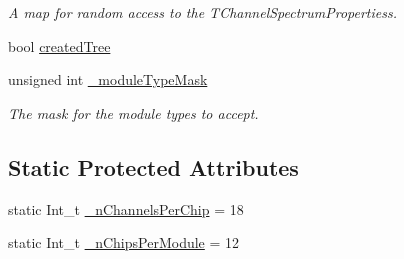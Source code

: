 \begin{DoxyCompactItemize}
\begin{DoxyCompactList}\small\item\em A map for random access to the TChannelSpectrumPropertiess. \item\end{DoxyCompactList}\item 
bool \hyperlink{class_spectrum_properties_run_info_afcbed8adc08c7cfbca19df402943a770}{createdTree}
\item 
unsigned int \hyperlink{class_spectrum_properties_run_info_a4d7328dfa2acc72cbaaf1b897c975b62}{\_\-moduleTypeMask}
\begin{DoxyCompactList}\small\item\em The mask for the module types to accept. \item\end{DoxyCompactList}\end{DoxyCompactItemize}
\subsection*{Static Protected Attributes}
\begin{DoxyCompactItemize}
\item 
static Int\_\-t \hyperlink{class_spectrum_properties_run_info_ac56bc4e28473056ac6daad4a7645fbf9}{\_\-nChannelsPerChip} = 18
\item 
static Int\_\-t \hyperlink{class_spectrum_properties_run_info_a67b550f7e4ba507ae8953f57c15f62f3}{\_\-nChipsPerModule} = 12
\end{DoxyCompactItemize}



